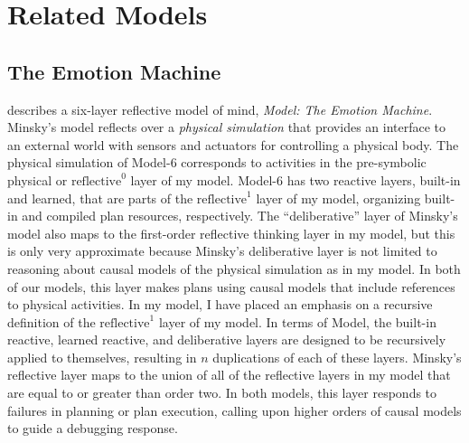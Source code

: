 \chapter{Related Models}
\label{chapter:related_models}

\section{The Emotion Machine}
\label{backreference:self_reflective_self_conscious}

\cite{minsky:2006} describes a six-layer reflective model of mind,
\emph{Model: The Emotion Machine}.  Minsky's model
reflects over a \emph{physical simulation} that provides an interface
to an external world with sensors and actuators for controlling a
physical body.  The physical simulation of {\mbox{Model-6}}
corresponds to activities in the pre-symbolic physical or
$\text{reflective}^0$ layer of my model.  {\mbox{Model-6}} has two
reactive layers, built-in and learned, that are parts of the
$\text{reflective}^1$ layer of my model, organizing built-in and
compiled plan resources, respectively.  The ``deliberative'' layer of
Minsky's model also maps to the first-order reflective thinking layer
in my model, but this is only very approximate because Minsky's
deliberative layer is not limited to reasoning about causal models of
the physical simulation as in my model.  In both of our models, this
layer makes plans using causal models that include references to
physical activities.  In my model, I have placed an emphasis on a
recursive definition of the $\text{reflective}^1$ layer of my model.
In terms of Model, the built-in reactive, learned
reactive, and deliberative layers are designed to be recursively
applied to themselves, resulting in $n$ duplications of each of these
layers.  Minsky's reflective layer maps to the union of all of the
reflective layers in my model that are equal to or greater than order
two.  In both models, this layer responds to failures in planning or
plan execution, calling upon higher orders of causal models to guide a
debugging response.

